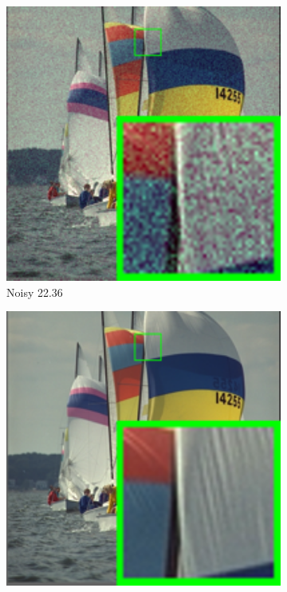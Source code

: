 \begin{figure}
    \centering
    \begin{subfigure}[t]{0.19\textwidth}
        \centering
        \includegraphics[width=1\textwidth]{images/mcwnnm/24images/resize_br_Noisy_nSig53015_kodim09.png}
		\caption{Noisy 22.36}
    \end{subfigure}
    \hfill
    \begin{subfigure}[t]{0.19\textwidth}
        \centering
        \includegraphics[width=1\textwidth]{images/mcwnnm/24images/resize_br_kodim09.png}

\end{subfigure}
\end{figure}
